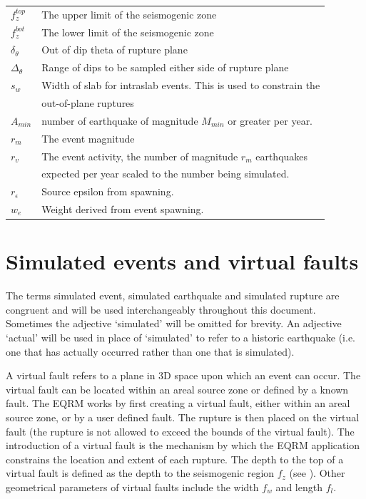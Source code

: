 \begin{table}
\begin{tabular}{l |  l}
$f_z^{top}$ & The upper limit of the seismogenic zone \\
$f_z^{bot}$ & The lower limit of the seismogenic zone \\ 
$\delta_\theta$ & Out of dip theta of rupture plane \\
$\Delta_\theta$ & Range of dips to be sampled either side of rupture plane \\
$s_w$ & Width of slab for intraslab events. This is used to constrain the \\
& out-of-plane ruptures \\
$A_{min}$ & number of earthquake of magnitude $M_{min}$ or greater per year. \\
$r_m$ & The event magnitude  \\ 
$r_v$ & The event activity, the number of magnitude $r_m$ earthquakes \\
& expected per year scaled to the number being simulated. \\
$r_\epsilon$ & Source epsilon from spawning. \\
$w_e$ & Weight derived from event spawning. \\
\hline
\end{tabular}
\end{table}


\section{Simulated events and virtual faults}
\label{sec:source-virtual_faults}

The terms simulated event, simulated
earthquake and simulated
rupture are congruent and will be used
interchangeably throughout this document. Sometimes the adjective
`simulated' will be omitted for brevity. An adjective `actual'
will be used in place of `simulated' to refer to a historic
earthquake (i.e. one that has actually occurred rather than one
that is simulated).

A virtual fault refers to a plane in 3D space upon which an event can
occur.  The virtual fault can be located within an areal source zone or defined by a known fault. 
The EQRM works by first creating a virtual fault, either within an
areal source zone, or by a user defined fault. The rupture is then placed 
on the virtual fault (the
rupture is not allowed to exceed the bounds of the virtual
fault). The introduction of a virtual
fault is the mechanism by which the
EQRM application constrains the location and extent
of each rupture. The depth to the top of a virtual
fault is defined as the depth to the
seismogenic region $f_z$ (see
). Other geometrical parameters
of virtual faults include the width $f_w$ and
length $f_l$. 


